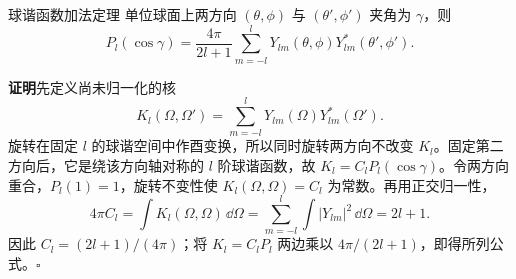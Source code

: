 \begin{advtheorem}{球谐函数加法定理}\label{advA4:thm:spherical-addition}
单位球面上两方向 $(\theta,\phi)$ 与 $(\theta',\phi')$ 夹角为 $\gamma$，则
\[
 \boxed{P_l(\cos\gamma)=\frac{4\pi}{2l+1}
 \sum_{m=-l}^{l}Y_{lm}(\theta,\phi)Y_{lm}^*(\theta',\phi')}.
\]
\end{advtheorem}
\noindent\textbf{证明}\quad 先定义尚未归一化的核
\[
 K_l(\Omega,\Omega')=\sum_{m=-l}^{l}Y_{lm}(\Omega)Y_{lm}^*(\Omega').
\]
旋转在固定 $l$ 的球谐空间中作酉变换，所以同时旋转两方向不改变 $K_l$。固定第二方向后，它是绕该方向轴对称的 $l$ 阶球谐函数，故
$K_l=C_lP_l(\cos\gamma)$。令两方向重合，$P_l(1)=1$，旋转不变性使 $K_l(\Omega,\Omega)=C_l$ 为常数。再用正交归一性，
\[
 4\pi C_l=\int K_l(\Omega,\Omega)\,\dd\Omega
 =\sum_{m=-l}^{l}\int |Y_{lm}|^2\,\dd\Omega=2l+1.
\]
因此 $C_l=(2l+1)/(4\pi)$；将 $K_l=C_lP_l$ 两边乘以 $4\pi/(2l+1)$，即得所列公式。\hfill$\square$


